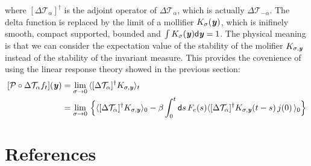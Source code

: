 \documentclass[aip,jcp,a4paper,reprint,onecolumn]{revtex4-1}
\newcommand{\vect}[1]{\textbf{\textit{#1}}}
\newcommand{\dd}{\textsf{d}}
\newcommand{\mt}{\mathcal T}
\begin{document}
where $[\Delta \mt_\alpha]^\dagger$ is the adjoint operator of $\Delta
\mt_\alpha$, which is actually $\Delta \mt_{-\alpha}$. The delta
function is replaced by the limit of a mollifier $K_\sigma(\vect y)$,
which is inifinely smooth, compact supported, bounded and $\int
K_\sigma(\vect y)\dd \vect y = 1$.  The physical meaning is that we
can consider the expectation value of the stability of the molifier
$K_{\sigma, \vect y}$ instead of the stability of the invariant measure.
This provides the covenience of using the linear response theory showed
in the previous section:
\begin{align}\nonumber
  [\mathcal P\circ\Delta \mt_\alpha f_t](\vect y)
  &=
  \lim_{\sigma \rightarrow 0}\,
  \langle
  [\Delta \mt_\alpha]^\dagger K_{\sigma, \vect y}
  \rangle_t \\
  &=
  \lim_{\sigma \rightarrow 0}\,
  \Big\{
  \langle
  [\Delta \mt_\alpha]^\dagger K_{\sigma, \vect y}
  \rangle_0  -
  \beta
  \int_0^t\dd s\,
  F_e(s)
  \langle
  [\Delta \mt_\alpha]^\dagger K_{\sigma, \vect y}(t-s)\,
  j(0)\,
  \rangle_0
  \Big\}
\end{align}



\section*{References}
{}

\end{document}
